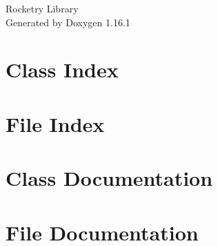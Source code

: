 \documentclass[twoside]{book}
\newcommand{\+}{\discretionary{\mbox{\scriptsize$\hookleftarrow$}}{}{}}
\newcommand{\clearemptydoublepage}{%
    \newpage{\pagestyle{empty}\cleardoublepage}%
  }
\begin{document}
  \raggedbottom
    \hypersetup{pageanchor=false,
                bookmarksnumbered=true,
                pdfencoding=unicode
               }
  \begin{titlepage}
  \vspace*{7cm}
  \begin{center}%
  {\Large Rocketry Library}\\
  \vspace*{1cm}
  {\large Generated by Doxygen 1.16.1}\\
  \end{center}
  \end{titlepage}
  \clearemptydoublepage
  \tableofcontents
  \clearemptydoublepage
  \hypersetup{pageanchor=true}
\chapter{Class Index}

\chapter{File Index}

\chapter{Class Documentation}



\chapter{File Documentation}





  \backmatter
  \newpage
  \clearemptydoublepage
  \printindex
\end{document}
